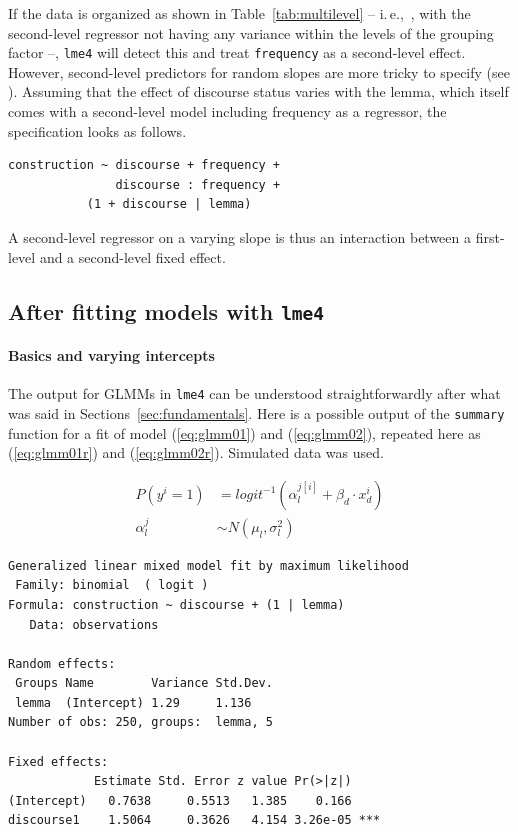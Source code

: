 \documentclass[a4paper,12pt]{article}
\newcommand{\ie}{i.\,e.,\ }
\begin{document}
If the data is organized as shown in Table~\ref{tab:multilevel} -- \ie, with the second-level regressor not having any variance within the levels of the grouping factor --, \texttt{lme4} will detect this and treat \texttt{frequency} as a second-level effect.
However, second-level predictors for random slopes are more tricky to specify (see \citealt[280-282]{GelmanHill2006}).
Assuming that the effect of discourse status varies with the lemma, which itself comes with a second-level model including frequency as a regressor, the specification looks as follows.

\vspace{0.5\baselineskip}

\begin{lstlisting}
construction ~ discourse + frequency +
               discourse : frequency +
	       (1 + discourse | lemma)
\end{lstlisting}

A second-level regressor on a varying slope is thus an interaction between a first-level and a second-level fixed effect.

\subsection{After fitting models with \texttt{lme4}}
\label{sec:afterfittingmodelswithlme4}

\paragraph{Basics and varying intercepts}

The output for GLMMs in \texttt{lme4} can be understood straightforwardly after what was said in Sections~\ref{sec:fundamentals}.
Here is a possible output of the \texttt{summary} function for a fit of model (\ref{eq:glmm01}) and (\ref{eq:glmm02}), repeated here as (\ref{eq:glmm01r}) and (\ref{eq:glmm02r}).
Simulated data was used.

\begin{align}
  P(y^i=1) & = logit^{-1}(\alpha_{l}^{j[i]}+\beta_d\cdot x_d^i)
  \label{eq:glmm01r} \\
  \alpha_l^j & \sim N(\mu_l,\sigma_l^2)
  \label{eq:glmm02r}
\end{align}

\vspace{0.5\baselineskip}

\begin{lstlisting}
Generalized linear mixed model fit by maximum likelihood 
 Family: binomial  ( logit )
Formula: construction ~ discourse + (1 | lemma)
   Data: observations

Random effects:
 Groups Name        Variance Std.Dev.
 lemma  (Intercept) 1.29     1.136   
Number of obs: 250, groups:  lemma, 5

Fixed effects:
            Estimate Std. Error z value Pr(>|z|)    
(Intercept)   0.7638     0.5513   1.385    0.166    
discourse1    1.5064     0.3626   4.154 3.26e-05 ***
\end{lstlisting}
\end{document}
